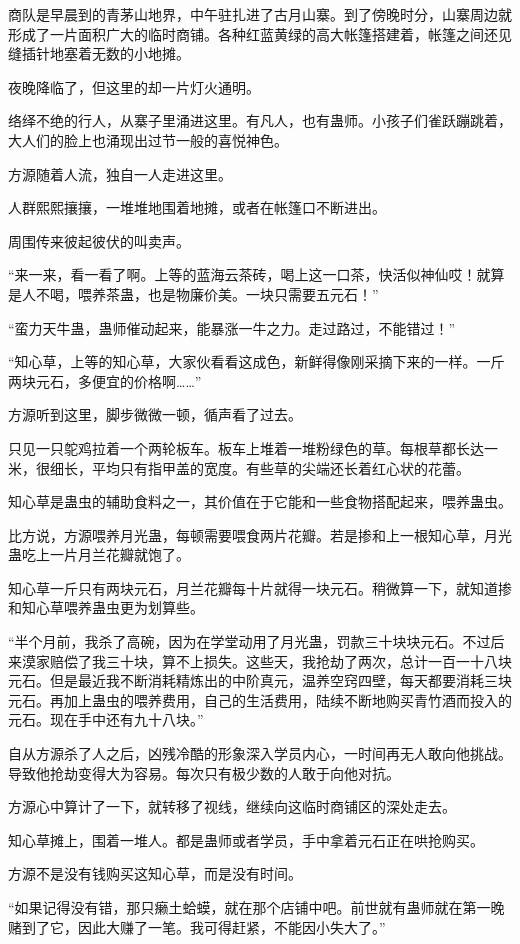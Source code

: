 \begin{this_body}
商队是早晨到的青茅山地界，中午驻扎进了古月山寨。到了傍晚时分，山寨周边就形成了一片面积广大的临时商铺。各种红蓝黄绿的高大帐篷搭建着，帐篷之间还见缝插针地塞着无数的小地摊。

夜晚降临了，但这里的却一片灯火通明。

络绎不绝的行人，从寨子里涌进这里。有凡人，也有蛊师。小孩子们雀跃蹦跳着，大人们的脸上也涌现出过节一般的喜悦神色。

方源随着人流，独自一人走进这里。

人群熙熙攘攘，一堆堆地围着地摊，或者在帐篷口不断进出。

周围传来彼起彼伏的叫卖声。

“来一来，看一看了啊。上等的蓝海云茶砖，喝上这一口茶，快活似神仙哎！就算是人不喝，喂养茶蛊，也是物廉价美。一块只需要五元石！”

“蛮力天牛蛊，蛊师催动起来，能暴涨一牛之力。走过路过，不能错过！”

“知心草，上等的知心草，大家伙看看这成色，新鲜得像刚采摘下来的一样。一斤两块元石，多便宜的价格啊……”

方源听到这里，脚步微微一顿，循声看了过去。

只见一只鸵鸡拉着一个两轮板车。板车上堆着一堆粉绿色的草。每根草都长达一米，很细长，平均只有指甲盖的宽度。有些草的尖端还长着红心状的花蕾。

知心草是蛊虫的辅助食料之一，其价值在于它能和一些食物搭配起来，喂养蛊虫。

比方说，方源喂养月光蛊，每顿需要喂食两片花瓣。若是掺和上一根知心草，月光蛊吃上一片月兰花瓣就饱了。

知心草一斤只有两块元石，月兰花瓣每十片就得一块元石。稍微算一下，就知道掺和知心草喂养蛊虫更为划算些。

“半个月前，我杀了高碗，因为在学堂动用了月光蛊，罚款三十块块元石。不过后来漠家赔偿了我三十块，算不上损失。这些天，我抢劫了两次，总计一百一十八块元石。但是最近我不断消耗精炼出的中阶真元，温养空窍四壁，每天都要消耗三块元石。再加上蛊虫的喂养费用，自己的生活费用，陆续不断地购买青竹酒而投入的元石。现在手中还有九十八块。”

自从方源杀了人之后，凶残冷酷的形象深入学员内心，一时间再无人敢向他挑战。导致他抢劫变得大为容易。每次只有极少数的人敢于向他对抗。

方源心中算计了一下，就转移了视线，继续向这临时商铺区的深处走去。

知心草摊上，围着一堆人。都是蛊师或者学员，手中拿着元石正在哄抢购买。

方源不是没有钱购买这知心草，而是没有时间。

“如果记得没有错，那只癞土蛤蟆，就在那个店铺中吧。前世就有蛊师就在第一晚赌到了它，因此大赚了一笔。我可得赶紧，不能因小失大了。”

\end{this_body}

